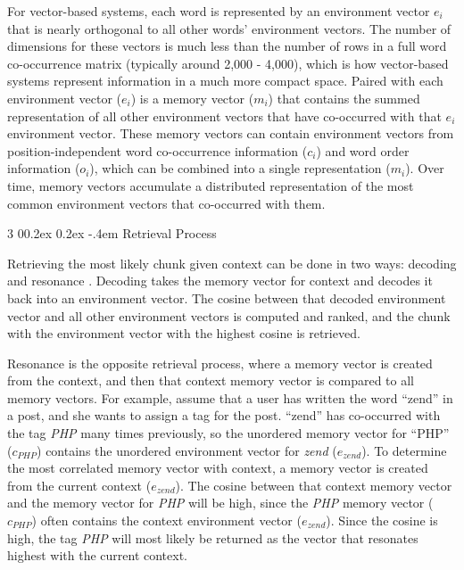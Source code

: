 \documentclass[man,floatsintext,donotrepeattitle]{apa6}
\makeatletter
\renewcommand{\subsubsection}{%
  \@startsection
  {subsubsection}%
  {3}%
  {\parindent}%
  {0\baselineskip \@plus 0.2ex \@minus 0.2ex}%
  {-.4em}%
  {\normalfont\normalsize\bfseries\addperi}}
\makeatother
\begin{document}
For vector-based systems, each word is represented by an environment vector $e_{i}$ that is nearly orthogonal to all other words' environment vectors.
The number of dimensions for these vectors is much less than the number of rows in a full word co-occurrence matrix (typically around 2,000 - 4,000), which is how vector-based systems represent information in a much more compact space.
Paired with each environment vector ($e_{i}$) is a memory vector ($m_{i}$) that contains the summed representation of all other environment vectors that have co-occurred with that $e_{i}$ environment vector.
These memory vectors can contain environment vectors from position-independent word co-occurrence information ($c_{i}$) and word order information ($o_{i}$), which can be combined into a single representation ($m_{i}$).
Over time, memory vectors accumulate a distributed representation of the most common environment vectors that co-occurred with them.

\subsubsection{Retrieval Process}

Retrieving the most likely chunk given context can be done in two ways: decoding and resonance \parencite{Jones2007}.
Decoding takes the memory vector for context and decodes it back into an environment vector.
The cosine between that decoded environment vector and all other environment vectors is computed and ranked, and the chunk with the environment vector with the highest cosine is retrieved.

Resonance is the opposite retrieval process, where a memory vector is created from the context, and then that context memory vector is compared to all memory vectors.
For example, assume that a user has written the word ``zend'' in a post, and she wants to assign a tag for the post.
``zend'' has co-occurred with the tag \emph{PHP} many times previously, so the unordered memory vector for ``PHP'' ($c_{\mathit{PHP}}$) contains the unordered environment vector for \emph{zend} ($e_{zend}$).
To determine the most correlated memory vector with context, a memory vector is created from the current context ($e_{zend}$).
The cosine between that context memory vector and the memory vector for \emph{PHP} will be high, since the \emph{PHP} memory vector ($c_{\mathit{PHP}}$) often contains the context environment vector ($e_{zend}$).
Since the cosine is high, the tag \emph{PHP} will most likely be returned as the vector that resonates highest with the current context.
\end{document}

